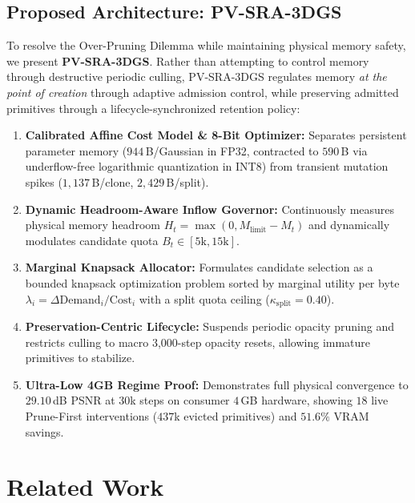 \documentclass[10pt,twocolumn,letterpaper]{article}
\begin{document}
\subsection{Proposed Architecture: PV-SRA-3DGS}

To resolve the Over-Pruning Dilemma while maintaining physical memory safety, we present \textbf{PV-SRA-3DGS}. Rather than attempting to control memory through destructive periodic culling, PV-SRA-3DGS regulates memory \textit{at the point of creation} through adaptive admission control, while preserving admitted primitives through a lifecycle-synchronized retention policy:
\begin{enumerate}
    \item \textbf{Calibrated Affine Cost Model \& 8-Bit Optimizer:} Separates persistent parameter memory ($944$\,B/Gaussian in FP32, contracted to $590$\,B via underflow-free logarithmic quantization in INT8) from transient mutation spikes ($1{,}137$\,B/clone, $2{,}429$\,B/split).
    \item \textbf{Dynamic Headroom-Aware Inflow Governor:} Continuously measures physical memory headroom $H_t = \max(0, M_{\text{limit}} - M_t)$ and dynamically modulates candidate quota $B_t \in [5\text{k}, 15\text{k}]$.
    \item \textbf{Marginal Knapsack Allocator:} Formulates candidate selection as a bounded knapsack optimization problem sorted by marginal utility per byte $\lambda_i = \Delta \text{Demand}_i / \text{Cost}_i$ with a split quota ceiling ($\kappa_{\text{split}} = 0.40$).
    \item \textbf{Preservation-Centric Lifecycle:} Suspends periodic opacity pruning and restricts culling to macro 3,000-step opacity resets, allowing immature primitives to stabilize.
    \item \textbf{Ultra-Low 4GB Regime Proof:} Demonstrates full physical convergence to $29.10$\,dB PSNR at 30k steps on consumer $4$\,GB hardware, showing $18$ live Prune-First interventions ($437$k evicted primitives) and $51.6\%$ VRAM savings.
\end{enumerate}

\section{Related Work}
\end{document}
